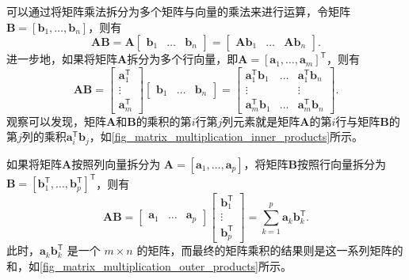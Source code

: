 可以通过将矩阵乘法拆分为多个矩阵与向量的乘法来进行运算，令矩阵\( \mathbf{B} = [\bm b_1, \ldots, \bm b_n] \)，则有
\[
    \mathbf{A}\mathbf{B} = \mathbf{A} \begin{bmatrix}
        \bm b_1 & \ldots & \bm b_n
    \end{bmatrix} =\begin{bmatrix}
        \mathbf{A}\bm b_1 & \ldots & \mathbf{A}\bm b_n
    \end{bmatrix}.
\]
进一步地，如果将矩阵\( \mathbf{A} \)拆分为多个行向量，即\( \mathbf{A} = [\bm{a}_1, \ldots, \bm{a}_m]^{\mathsf{T}} \)，则有
\[
    \mathbf{A}\mathbf{B} =
    \begin{bmatrix}
        \bm a^{\mathsf T}_1 \\
        \vdots              \\
        \bm a^{\mathsf T}_m
    \end{bmatrix}
    \begin{bmatrix}
        \bm b_1 & \ldots & \bm b_n
    \end{bmatrix} =
    \begin{bmatrix}
        \bm a^{\mathsf T}_1\bm b_1 & \ldots & \bm a^{\mathsf T}_1\bm b_n \\
        \vdots                     &        & \vdots                     \\
        \bm a^{\mathsf T}_m\bm b_1 & \ldots & \bm a^{\mathsf T}_m\bm b_n
    \end{bmatrix}.
\]
观察可以发现，矩阵\( \mathbf{A} \)和\( \mathbf{B} \)的乘积的第\( i \)行第\( j \)列元素就是矩阵\( \mathbf{A} \)的第\( i \)行与矩阵\( \mathbf{B} \)的第\( j \)列的乘积\( \bm{a}_i^{\mathsf{T}}\bm b_j \)，如\cref{fig_matrix_multiplication_inner_products}所示。

如果将矩阵\( \mathbf{A} \)按照列向量拆分为 \( \mathbf{A} = [\bm{a}_1, \ldots, \bm{a}_p] \)，将矩阵\( \mathbf{B} \)按照行向量拆分为 \( \mathbf{B} = [\bm{b}_1^{\mathsf{T}}, \ldots, \bm{b}_p^{\mathsf{T}}]^{\mathsf{T}} \)，则有
\[
    \mathbf{A}\mathbf{B} =
    \begin{bmatrix}
        \bm a_1 & \ldots & \bm a_p
    \end{bmatrix}
    \begin{bmatrix}
        \bm b_1^{\mathsf T} \\
        \vdots              \\
        \bm b_p^{\mathsf T}
    \end{bmatrix} =
    \sum_{k=1}^{p} \bm a_k \bm b_k^{\mathsf T}.
\]
此时，\( \bm{a}_k \bm{b}_k^{\mathsf T} \) 是一个 \( m \times n \) 的矩阵，而最终的矩阵乘积的结果则是这一系列矩阵的和，如\cref{fig_matrix_multiplication_outer_products}所示。

